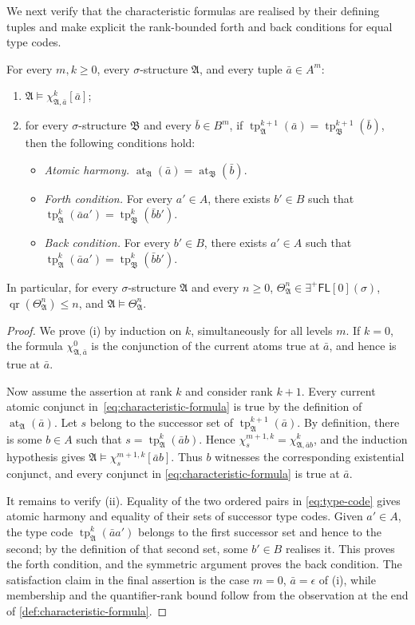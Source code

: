 \documentclass{lmcs}
\newcommand{\EPFL}{\exists^{+}\!\mathsf{FL}}
\newcommand{\qr}{\operatorname{qr}}
\newcommand{\at}{\operatorname{at}}
\newcommand{\tp}{\operatorname{tp}}
\newcommand{\A}{\mathfrak{A}}
\newcommand{\B}{\mathfrak{B}}
\begin{document}
We next verify that the characteristic formulas are realised by their defining
tuples and make explicit the rank-bounded forth and back conditions for equal
type codes.

\begin{lem}\label{lem:chi-basic}
For every $m,k\geq0$, every $\sigma$-structure $\A$, and every tuple
$\bar a\in A^m$:
\begin{enumerate}[label=\textup{(\roman*)}]
  \item $\A\models\chi_{\A,\bar a}^{k}[\bar a]$;
  \item for every $\sigma$-structure $\B$ and every $\bar b\in B^m$, if
  $\tp_{\A}^{k+1}(\bar a)=\tp_{\B}^{k+1}(\bar b)$, then the following
  conditions hold:
  \begin{itemize}
    \item \emph{Atomic harmony.}
    $\at_{\A}(\bar a)=\at_{\B}(\bar b)$.
    \item \emph{Forth condition.}  For every $a'\in A$, there exists $b'\in B$ such
    that
    $\tp_{\A}^{k}(\bar a a')=\tp_{\B}^{k}(\bar b b')$.
    \item \emph{Back condition.}  For every $b'\in B$, there exists $a'\in A$ such
    that
    $\tp_{\A}^{k}(\bar a a')=\tp_{\B}^{k}(\bar b b')$.
  \end{itemize}
\end{enumerate}
In particular, for every $\sigma$-structure $\A$ and every $n\geq0$,
$\Theta_{\A}^{n}\in\EPFL[0](\sigma)$,
$\qr(\Theta_{\A}^{n})\leq n$, and $\A\models\Theta_{\A}^{n}$.
\end{lem}

\begin{proof}
We prove (i) by induction on $k$, simultaneously for all levels $m$.  If
$k=0$, the formula
$\chi_{\A,\bar a}^{0}$ is the conjunction of the current atoms true at
$\bar a$, and hence is true at $\bar a$.

Now assume the assertion at rank $k$ and consider rank $k+1$.  Every current
atomic conjunct in~\eqref{eq:characteristic-formula} is true by the definition of
$\at_{\A}(\bar a)$.  Let $s$ belong to the successor set of
$\tp_{\A}^{k+1}(\bar a)$.  By definition, there is some $b\in A$ such that
$s=\tp_{\A}^{k}(\bar a b)$.  Hence
$\chi_s^{m+1,k}=\chi_{\A,\bar a b}^k$, and the induction hypothesis gives
$\A\models\chi_s^{m+1,k}[\bar a b]$.  Thus $b$ witnesses the corresponding
existential conjunct, and every conjunct in
\eqref{eq:characteristic-formula} is true at $\bar a$.

It remains to verify (ii).  Equality of the two ordered pairs in
\eqref{eq:type-code} gives atomic harmony and equality of their sets of successor type
codes.  Given $a'\in A$, the type code
$\tp_{\A}^{k}(\bar a a')$ belongs to the first successor set and hence to
the second; by the definition of that second set, some $b'\in B$ realises it.
This proves the forth condition, and the symmetric argument proves the back
condition.
The satisfaction claim in the final assertion is the case $m=0$,
$\bar a=\epsilon$ of (i), while membership and the quantifier-rank bound
follow from the observation at the end of
\cref{def:characteristic-formula}.
\end{proof}
\end{document}
